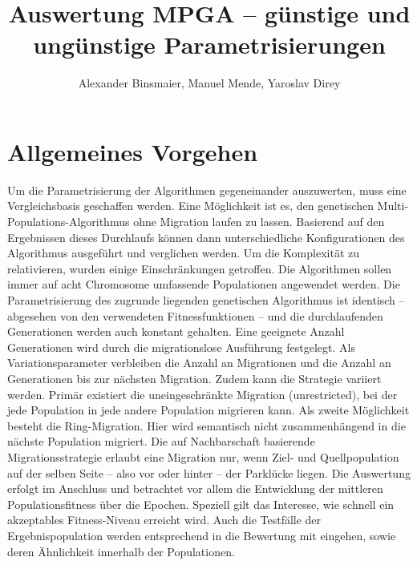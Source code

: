 \documentclass[12pt,a4paper]{article}
\author{Alexander Binsmaier, Manuel Mende, Yaroslav Direy}
\title{Auswertung MPGA -- günstige und ungünstige Parametrisierungen}
\begin{document}
\maketitle
\tableofcontents
\section{Allgemeines Vorgehen}
Um die Parametrisierung der Algorithmen gegeneinander auszuwerten, muss eine Vergleichsbasis geschaffen werden. Eine Möglichkeit ist es, den genetischen Multi-Populations-Algorithmus ohne Migration laufen zu lassen. Basierend auf den Ergebnissen dieses Durchlaufs können dann unterschiedliche Konfigurationen des Algorithmus ausgeführt und verglichen werden. Um die Komplexität zu relativieren, wurden einige Einschränkungen getroffen. Die Algorithmen sollen immer auf acht Chromosome umfassende Populationen angewendet werden. Die Parametrisierung des zugrunde liegenden genetischen Algorithmus ist identisch -- abgesehen von den verwendeten Fitnessfunktionen -- und die durchlaufenden Generationen werden auch konstant gehalten. Eine geeignete Anzahl Generationen wird durch die migrationslose Ausführung festgelegt. Als Variationsparameter verbleiben die Anzahl an Migrationen und die Anzahl an Generationen bis zur nächsten Migration. Zudem kann die Strategie variiert werden.
Primär existiert die uneingeschränkte Migration (unrestricted), bei der jede Population in jede andere Population migrieren kann. Als zweite Möglichkeit besteht die Ring-Migration. Hier wird semantisch nicht zusammenhängend in die nächste Population migriert. Die auf Nachbarschaft basierende Migrationsstrategie erlaubt eine Migration nur, wenn Ziel- und Quellpopulation auf der selben Seite -- also vor oder hinter -- der Parklücke liegen. 
Die Auswertung erfolgt im Anschluss und betrachtet vor allem die Entwicklung der mittleren Populationsfitness über die Epochen. Speziell gilt das Interesse, wie schnell ein akzeptables Fitness-Niveau erreicht wird. Auch die Testfälle der Ergebnispopulation werden entsprechend in die Bewertung mit eingehen, sowie deren Ähnlichkeit innerhalb der Populationen.
\end{document}
